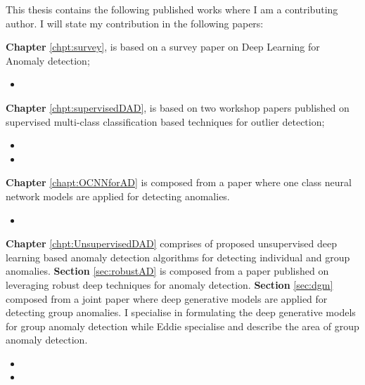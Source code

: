 
This thesis contains the following published works where  I am a contributing author.  I will state my contribution in the following papers:

{\bf Chapter} \ref{chpt:survey}, is based on a survey paper on Deep Learning for Anomaly detection;
\begin{itemize}
 \item {}
\end{itemize}

{\bf Chapter} \ref{chpt:supervisedDAD}, is based on two workshop papers published  on supervised multi-class classification based techniques for outlier detection;
\begin{itemize}
 \item {}
 \item {}
\end{itemize}


{\bf Chapter} \ref{chapt:OCNNforAD} is composed from a  paper
 where one class neural network models are applied for detecting anomalies.
\begin{itemize}
\item  {}
\end{itemize}

{\bf Chapter}  \ref{chpt:UnsupervisedDAD} comprises of proposed unsupervised  deep learning based anomaly detection algorithms for detecting individual and group anomalies. {\bf Section} \ref{sec:robustAD} is composed from a paper published on leveraging robust deep techniques for anomaly detection. {\bf Section} \ref{sec:dgm} composed from a joint paper where deep generative models are applied for detecting group anomalies. I specialise in formulating the deep generative models for group anomaly detection while Eddie specialise and describe the area of group anomaly detection.

\begin{itemize}
\item  {}
\item  {}
\end{itemize}

